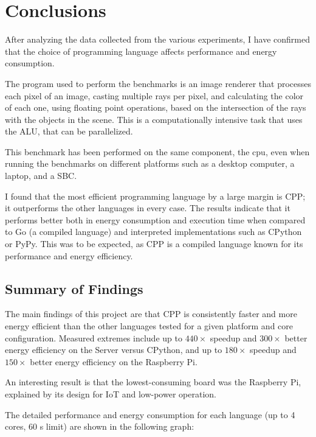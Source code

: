 \chapter{Conclusions}\label{chap:conclusions}

After analyzing the data collected from the various experiments, I have confirmed that the choice of programming language affects performance and energy consumption.

The program used to perform the benchmarks is an image renderer that processes each pixel of an image, casting multiple rays per pixel, and calculating the color of each one, using floating point operations, based on the intersection of the rays with the objects in the scene. This is a computationally intensive task that uses the \gls{ALU}, that can be parallelized.

This benchmark has been performed on the same component, the \gls{cpu}, even when running the benchmarks on different platforms such as a desktop computer, a laptop, and a \gls{SBC}.

I found that the most efficient programming language by a large margin is \gls{CPP}; it outperforms the other languages in every case. The results indicate that it performs better both in energy consumption and execution time when compared to Go (a compiled language) and interpreted implementations such as \gls{CPython} or PyPy. This was to be expected, as \gls{CPP} is a compiled language known for its performance and energy efficiency.


\section{Summary of Findings}
The main findings of this project are that \gls{CPP} is consistently faster and more energy efficient than the other languages tested for a given platform and core configuration. Measured extremes include up to $440\times$ speedup and $300\times$ better energy efficiency on the Server versus \gls{CPython}, and up to $180\times$ speedup and $150\times$ better energy efficiency on the Raspberry Pi.

An interesting result is that the lowest-consuming board was the Raspberry Pi, explained by its design for IoT and low-power operation.

The detailed performance and energy consumption for each language (up to 4 cores, 60 s limit) are shown in the following graph:



